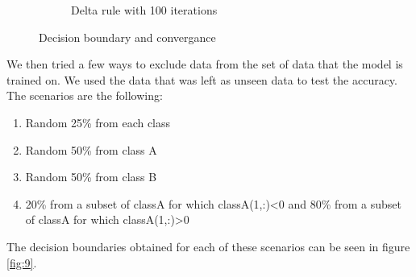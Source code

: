 \documentclass[a4paper]{article}
\begin{document}
\begin{figure}[htb]
\begin{subfigure}{0.4\textwidth}
        \caption{Delta rule with 100 iterations}
        \label{fig:new-data-convergance}
    \end{subfigure}
    \caption{Decision boundary and convergance}
    \label{fig:8}
\end{figure}

We then tried a few ways to exclude data from the set of data that the model is trained on. We used the data that was left as unseen data to test the accuracy. The scenarios are the following:
\begin{enumerate}
    \item Random 25\% from each class
    \item Random 50\% from class A
    \item Random 50\% from class B
    \item 20\% from a subset of classA for which classA(1,:)<0 and 80\% from a
subset of classA for which classA(1,:)>0
\end{enumerate}

The decision boundaries obtained for each of these scenarios can be seen in figure \ref{fig:9}.
\end{document}

